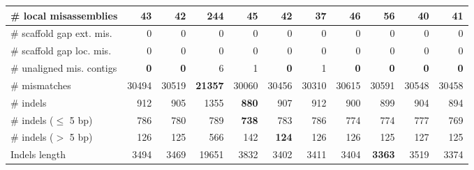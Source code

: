 \documentclass[12pt,a4paper]{article}
\begin{document}
\begin{table}[ht]
\begin{center}
\begin{tabular}{|l*{10}{|r}|}
\# local misassemblies & 43 & 42 & 244 & 45 & 42 & {\bf 37} & 46 & 56 & 40 & 41 \\ \hline
\# scaffold gap ext. mis. & 0 & 0 & 0 & 0 & 0 & 0 & 0 & 0 & 0 & 0 \\ \hline
\# scaffold gap loc. mis. & 0 & 0 & 0 & 0 & 0 & 0 & 0 & 0 & 0 & 0 \\ \hline
\# unaligned mis. contigs & {\bf 0} & {\bf 0} & 6 & 1 & {\bf 0} & 1 & {\bf 0} & {\bf 0} & {\bf 0} & {\bf 0} \\ \hline
\# mismatches & 30494 & 30519 & {\bf 21357} & 30060 & 30456 & 30310 & 30615 & 30591 & 30548 & 30458 \\ \hline
\# indels & 912 & 905 & 1355 & {\bf 880} & 907 & 912 & 900 & 899 & 904 & 894 \\ \hline
\hspace{5mm}\# indels ($\leq$ 5 bp) & 786 & 780 & 789 & {\bf 738} & 783 & 786 & 774 & 774 & 777 & 769 \\ \hline
\hspace{5mm}\# indels ($>$ 5 bp) & 126 & 125 & 566 & 142 & {\bf 124} & 126 & 126 & 125 & 127 & 125 \\ \hline
Indels length & 3494 & 3469 & 19651 & 3832 & 3402 & 3411 & 3404 & {\bf 3363} & 3519 & 3374 \\ \hline
\end{tabular}
\end{center}
\end{table}
\end{document}
